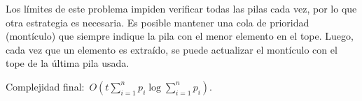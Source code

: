 
Los límites de este problema impiden verificar todas las pilas cada vez, por lo que
otra estrategia es necesaria. Es posible mantener una cola de prioridad (montículo)
que siempre indique la pila con el menor elemento en el tope. Luego, cada vez que un
elemento es extraído, se puede actualizar el montículo con el tope de la última pila
usada.

Complejidad final:~$O(t\sum_{i=1}^np_i \log \sum_{i=1}^np_i)$.


